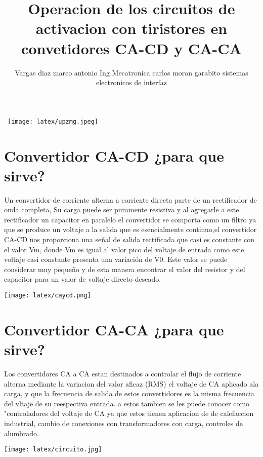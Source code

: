 ﻿\documentclass[10pt,a4paper]{article}
\author{Vargas diaz marco antonio
Ing Mecatronica
carlos moran garabito
sistemas electronicos de interfaz}
\title{Operacion de los circuitos de activacion con tiristores en convetidores CA-CD y CA-CA}
\begin{document}
\maketitle\
\texttt{[image: latex/upzmg.jpeg]} 
\newpage
\maketitle\section{Convertidor CA-CD ¿para que sirve?}
Un  convertidor  de  corriente  alterna  a  corriente  directa  parte  de  un  rectificador  de  onda  completa,  Su  carga  puede  ser  puramente  resistiva y al  agregarle  a  este  rectificador  un  capacitor en paralelo el convertidor se comporta como un filtro ya que se produce un voltaje a la salida que es esencialmente continuo,el  convertidor  CA-CD  nos  proporciona  una  señal  de  salida  rectificada que casi es constante con el valor  Vm,  donde  Vm  es  igual  al  valor  pico  del  voltaje  de  entrada como este  voltaje  casi  constante  presenta  una  variación  de  V0.  Este  valor  se  puede  considerar  muy  pequeño  y  de  esta  manera  encontrar  el  valor  del  resistor  y  del capacitor para un valor de voltaje directo deseado. 



\texttt{[image: latex/caycd.png]} 
\maketitle\section{Convertidor CA-CA ¿para que sirve?}
Los convertidores CA a CA estan destinados a controlar el flujo de corriente alterna mediante la variacion del valor aficaz (RMS) el voltaje de CA aplicado ala carga, y que la frecuencia de salida de estos convertidores es la misma frecuencia del vltaje de su reespectiva entrada.
a estos tambien se les puede conocer como "controladores del voltaje de CA ya que estos tienen aplicacion de de calefaccion industrial, cambio de conexiones con transformadores con carga, controles de alumbrado.

\texttt{[image: latex/circuito.jpg]} 
\newpage
\end{document}
